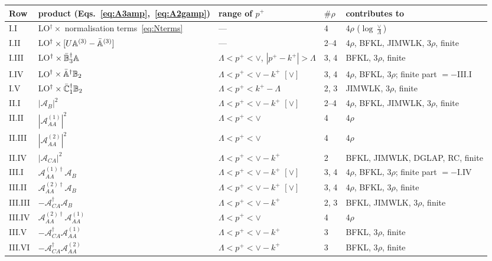\begin{table}[t]
\centering
\renewcommand{\arraystretch}{1.2}
\footnotesize
\begin{tabular}{@{}l p{4.0cm} p{2.9cm} l p{3.4cm}@{}}
\toprule
Row & product (Eqs.~\eqref{eq:A3amp},~\eqref{eq:A2gamp}) & range of $p^+$ & $\#\rho$ & contributes to\\
\midrule
I.I & LO$^\dagger\times$ normalisation terms~\eqref{eq:Nterms} & --- & 4 & 4$\rho$ ($\log\frac{\vee}{\Lambda}$)\\
I.II & LO$^\dagger\times[U\mathbb{A}^{(3)}-\bar{\mathbb{A}}^{(3)}]$ & --- & 2--4 & 4$\rho$, BFKL, JIMWLK, 3$\rho$, finite\\
I.III & LO$^\dagger\times\bar{\mathbb{B}}_3^\dagger\mathbb{A}$ & $\Lambda<p^+<\vee$, $|p^+-k^+|>\Lambda$ & 3, 4 & BFKL, 3$\rho$, finite\\
I.IV & LO$^\dagger\times\bar{\mathbb{A}}^\dagger\mathbb{B}_2$ & $\Lambda<p^+<\vee-k^+$ $[\vee]$ & 3, 4 & 4$\rho$, BFKL, 3$\rho$; finite part $=-$III.I\\
I.V & LO$^\dagger\times\bar{\mathbb{C}}_1^\dagger\mathbb{B}_2$ & $\Lambda<p^+<k^+-\Lambda$ & 2, 3 & JIMWLK, 3$\rho$, finite\\
\midrule
II.I & $|\mathcal A_B|^2$ & $\Lambda<p^+<\vee-k^+$ $[\vee]$ & 2--4 & 4$\rho$, BFKL, JIMWLK, 3$\rho$, finite\\
II.II & $|\mathcal A^{(1)}_{AA}|^2$ & $\Lambda<p^+<\vee$ & 4 & 4$\rho$\\
II.III & $|\mathcal A^{(2)}_{AA}|^2$ & $\Lambda<p^+<\vee$ & 4 & 4$\rho$\\
II.IV & $|\mathcal A_{CA}|^2$ & $\Lambda<p^+<\vee-k^+$ & 2 & BFKL, JIMWLK, DGLAP, RC, finite\\
\midrule
III.I & $\mathcal A^{(1)\dagger}_{AA}\mathcal A_B$ & $\Lambda<p^+<\vee-k^+$ $[\vee]$ & 3, 4 & 4$\rho$, BFKL, 3$\rho$; finite part $=-$I.IV\\
III.II & $\mathcal A^{(2)\dagger}_{AA}\mathcal A_B$ & $\Lambda<p^+<\vee-k^+$ $[\vee]$ & 3, 4 & 4$\rho$, BFKL, 3$\rho$, finite\\
III.III & $-\mathcal A^{\dagger}_{CA}\mathcal A_B$ & $\Lambda<p^+<\vee-k^+$ & 2, 3 & BFKL, JIMWLK, 3$\rho$, finite\\
III.IV & $\mathcal A^{(2)\dagger}_{AA}\mathcal A^{(1)}_{AA}$ & $\Lambda<p^+<\vee$ & 4 & 4$\rho$\\
III.V & $-\mathcal A^{\dagger}_{CA}\mathcal A^{(1)}_{AA}$ & $\Lambda<p^+<\vee-k^+$ & 3 & BFKL, 3$\rho$, finite\\
III.VI & $-\mathcal A^{\dagger}_{CA}\mathcal A^{(2)}_{AA}$ & $\Lambda<p^+<\vee-k^+$ & 3 & BFKL, 3$\rho$, finite\\

\end{tabular}
\end{table}
